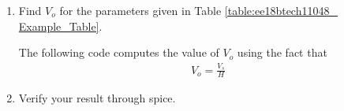 \begin{enumerate}[label=\arabic*.,ref=\theenumi]
\begin{table}[!ht]
\centering

\caption{}
\label{table:ee18btech11048_ Input_Table}
\end{table}


\item Find $V_o$ for the parameters given in  Table  \ref{table:ee18btech11048_ Example_Table}.
\begin{table}[!ht]
\centering

\caption{}
\label{table:ee18btech11048_ Example_Table}
\end{table}
\solution  The following code computes the value of $V_o$ using the fact that
\begin{align}
V_o = \frac{V_s}{H}
\end{align}
\item Verify your result through spice.
\\
\solution
\end{enumerate}
